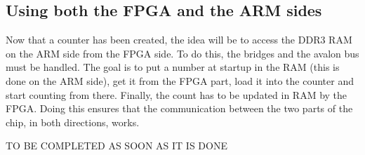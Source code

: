 \documentclass[12pt]{article}
\begin{document}
\subsection{Using both the FPGA and the ARM sides}

Now that a counter has been created, the idea will be to access the DDR3 RAM on the ARM side from the FPGA side. To do this, the bridges and the avalon bus must be handled. The goal is to put a number at startup in the RAM (this is done on the ARM side), get it from the FPGA part, load it into the counter and start counting from there. Finally, the count has to be updated in RAM by the FPGA. Doing this ensures that the communication between the two parts of the chip, in both directions, works.

\vspace{12pt}
TO BE COMPLETED AS SOON AS IT IS DONE
\end{document}
